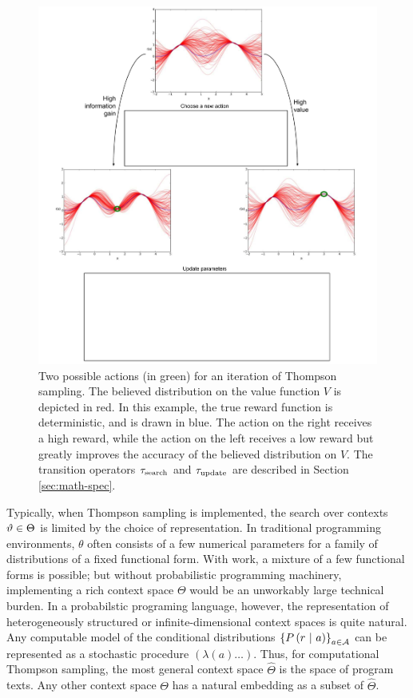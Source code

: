 \begin{figure}
  \centering
  \includegraphics[width=\linewidth]{figs/slide2.pdf}
  \caption{
    Two possible actions (in green) for an iteration of Thompson sampling.  The
    believed distribution on the value function $V$ is depicted in red.  In this
    example, the true reward function is deterministic, and is drawn in blue.
    The action on the right receives a high reward, while the action on the left
    receives a low reward but greatly improves the accuracy of the believed
    distribution on $V$.  The transition operators $\tau_{\textrm{search}}$ and
    $\tau_{\textrm{update}}$ are described in Section \ref{sec:math-spec}.
  }
  \label{fig:slide2}
\end{figure}

Typically, when Thompson sampling is implemented, the search over contexts
$\vartheta \in \Theta$ is limited by the choice of representation.  In
traditional programming environments, $\theta$ often consists of a few
numerical parameters for a family of distributions of a fixed functional
form.  With work, a mixture of a few functional forms is possible; but
without probabilistic programming machinery, implementing a rich context
space $\Theta$ would be an unworkably large technical burden.  In a
probabilstic programing language, however, the representation of
heterogeneously structured or infinite-dimensional context spaces is quite
natural.  Any computable model of the conditional distributions
$\left\{ P\left( r \ \middle\vert\  a \right) \right\}_{a \in \mathcal{A}}$ can be represented as a stochastic
procedure $(\lambda (a) \ldots)$.  Thus, for computational Thompson sampling,
the most general context space $\widehat\Theta$ is the space of program texts.
Any other context space $\Theta$ has a natural embedding as a subset of
$\widehat\Theta$.

